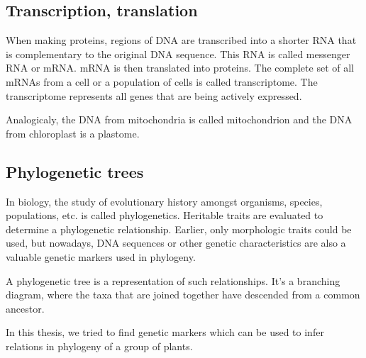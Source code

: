 \subsection{Transcription, translation}%
When making proteins, regions of DNA are transcribed into a shorter RNA that is complementary to the original DNA sequence. 
This RNA is called messenger RNA or mRNA. mRNA is then translated into proteins. The complete set of all mRNAs from a 
cell or a population of cells is called transcriptome. The transcriptome represents all genes that are being actively expressed. 

Analogicaly, the DNA from mitochondria is called mitochondrion and the DNA from chloroplast is a plastome. 



\subsection{Phylogenetic trees}
In biology, the study of evolutionary history amongst organisms, species, populations, etc. is called phylogenetics. Heritable traits 
are evaluated to determine a phylogenetic relationship. Earlier, only morphologic traits could be used, but nowadays, DNA sequences 
or other genetic characteristics are also a valuable genetic markers used in phylogeny. 

A phylogenetic tree is a representation of such relationships. It's a branching diagram, where the taxa that are joined together have 
descended from a common ancestor. 

In this thesis, we tried to find genetic markers which can be used to infer relations in phylogeny of a group of plants. 


